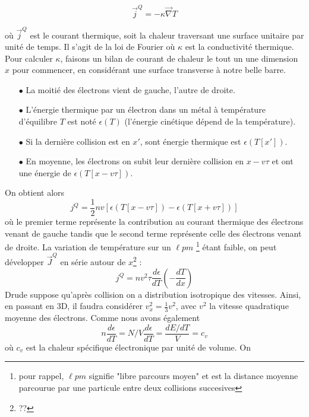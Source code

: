 \begin{equation}
	\vec{j}^Q = -\kappa\vec\nabla T
\end{equation}

où $\vec{j}^Q$ est le courant thermique, soit la chaleur traversant une surface
 unitaire par unité de temps. Il s'agit de la loi de Fourier où $\kappa$ est la 
 conductivité thermique. Pour calculer $\kappa$, faisons un bilan de courant de 
 chaleur le tout un une dimension $x$ pour commencer, en considérant une surface
 transverse à notre belle barre.
\begin{itemize}
	\item[$\bullet$] La moitié des électrons vient de gauche, l'autre de droite.
	\item[$\bullet$] L'énergie thermique par un électron dans un métal à 
	      température d'équilibre $T$ est noté $\epsilon(T)$ (l'énergie cinétique 
	      dépend de la température).
	\item[$\bullet$] Si la dernière collision est en $x'$, sont énergie thermique 
	      est $\epsilon(T[x'])$.
	\item[$\bullet$] En moyenne, les électrons on subit leur dernière collision 
	      en $x - v\tau$ et ont une énergie de $\epsilon(T[x-v\tau])$.
\end{itemize}
On obtient alors
\begin{equation}
	j^Q = \frac{1}{2}nv[\epsilon(T[x-v\tau]) - \epsilon(T[x+v\tau])]
\end{equation}
où le premier terme représente la contribution au courant thermique des électrons
 venant de gauche tandis que le second terme représente celle des électrons venant de droite.
La variation de température sur un $\ell pm$ \footnote{pour rappel, $\ell pm$ signifie "libre
 parcours moyen" et est la distance moyenne parcourue par une particule entre deux collisions 
 succesives } étant faible, on peut développer 
$\vec{J}^Q$ en série autour de $x$\footnote{??} :
\begin{equation}
	j^Q = nv^2\tau\frac{d\epsilon}{dT}\left(-\dfrac{dT}{dx}\right)
\end{equation}
Drude suppose qu'après collision on a distribution isotropique des vitesses. Ainsi, 
en passant en 3D, il faudra considérer $v_x^2 = \frac{1}{3}v^2$, avec $v^2$ la vitesse 
quadratique moyenne des électrons. Comme nous avons également
\begin{equation}
	n\frac{d\epsilon}{dT} = N/V\frac{d\epsilon}{dT} = \frac{dE/dT}{V} = c_v
\end{equation} 
où $c_v$ est la chaleur spécifique électronique par unité de volume. On 
